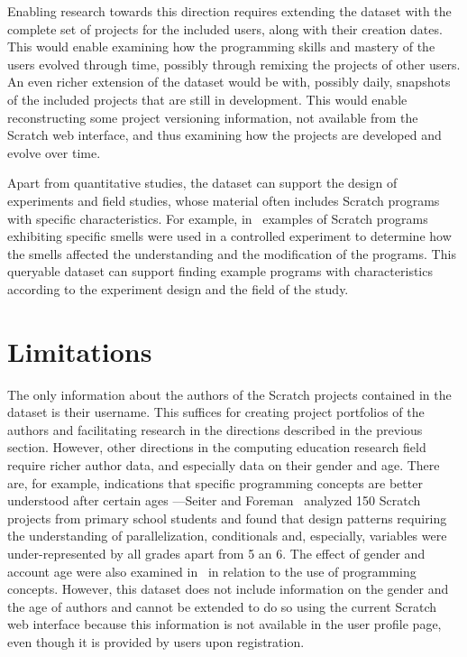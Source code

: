 \documentclass[10pt, conference]{IEEEtran}
\begin{document}
Enabling research towards this direction requires extending the dataset with the complete set of projects for the included users, along with their creation dates.
This would enable examining how the programming skills and mastery of the users evolved through time, possibly through remixing the projects of other users.
An even richer extension of the dataset would be with, possibly daily, snapshots of the included projects that are still in development.
This would enable reconstructing some project versioning information, not available from the Scratch web interface, and thus examining how the projects are developed and evolve over time.

Apart from quantitative studies, the dataset can support the design of experiments and field studies, whose material often includes Scratch programs with specific characteristics.
For example, in~\cite{hermans_2016} examples of Scratch programs exhibiting specific smells were used in a controlled experiment to determine how the smells affected the understanding and the modification of the programs.
This queryable dataset can support finding example programs with characteristics according to the experiment design and the field of the study.

\section{Limitations}
The only information about the authors of the Scratch projects contained in the dataset is their username.
This suffices for creating project portfolios of the authors and facilitating research in the directions described in the previous section.
However, other directions in the computing education research field require richer author data, and especially data on their gender and age.
There are, for example, indications that specific programming concepts are better understood after certain ages ---Seiter and Foreman~\cite{Seiter_2013} analyzed 150 Scratch projects from primary school students and found that design patterns requiring the understanding of parallelization, conditionals and, especially, variables were under-represented by all grades apart from 5 an 6.
The effect of gender and account age were also examined in~\cite{fields_2014} in relation to the use of programming concepts.
However, this dataset does not include information on the gender and the age of authors and cannot be extended to do so using the current Scratch web interface because this information is not available in the user profile page\footnotemark[\ref{fn-authorpage}], even though it is provided by users upon registration.
\end{document}
